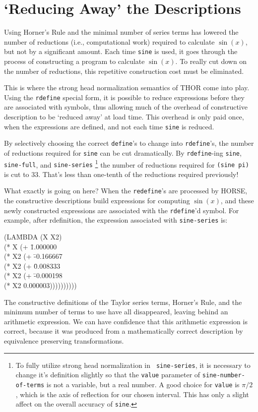 \section{`Reducing Away' the Descriptions}

	Using Horner's Rule and the minimal number of series terms has lowered the
number of reductions (i.e., computational work) required to calculate
$\sin(x)$, but not by a significant amount.  Each time {\tt sine} is
used, it goes through the process of constructing a program to calculate
$\sin(x)$.  To really cut down on the number of reductions, this
repetitive construction cost must be eliminated.

	This is where the strong head normalization semantics of THOR come
into play.  Using the {\tt rdefine} special form, it is possible to
reduce expressions before they are associated with symbols, thus
allowing much of the overhead of constructive description to be `reduced
away' at load time.  This overhead is only paid once, when the
expressions are defined, and not each time {\tt sine} is reduced.

	By selectively choosing the correct {\tt define}'s to change into
{\tt rdefine}'s, the number of reductions required for {\tt sine} can be
cut dramatically.  By {\tt rdefine}-ing {\tt sine}, {\tt sine-full}, and
{\tt sine-series} 
	\footnote{To fully utilize strong head normalization in {\tt
	sine-series}, it is necessary to change it's definition slightly
	so that the {\tt value} parameter of {\tt sine-number-of-terms} is
	not a variable, but a real number.  A good choice for {\tt value}
	is $\pi/2$, which is the axis of reflection for our chosen interval.
	This has only a slight affect on the overall accuracy of {\tt sine}.}
the number of reductions required for {\tt (sine pi)}
is cut to 33.  That's less than one-tenth of the reductions required
previously!

	What exactly is going on here?  When the {\tt redefine}'s are
processed by HORSE, the constructive descriptions build expressions for
computing $\sin(x)$, and these newly constructed expressions are
associated with the {\tt rdefine}'d symbol.  For example, after
rdefinition, the expression associated with {\tt sine-series} is:

\pagebreak
\begin{tt}\begin{tabbing}
(LA\=MBDA (X X2) \\
\>	(* X (+ \=1.000000\\
\>\>	     (* X2 (+ \=-0.166667 \\
\>\>\>			      (* X2 (+ \=0.008333 \\
\>\>\>\>							(* X2 (+ \=-0.000198 \\
\>\>\>\>\>									(* X2 0.000003))))))))))
\end{tabbing}\end{tt}
The constructive definitions of the Taylor series terms, Horner's Rule,
and the minimum number of terms to use have all disappeared, leaving
behind an arithmetic expression.  We can have confidence that this
arithmetic expression is correct, because it was produced from a
mathematically correct description by equivalence preserving transformations.

